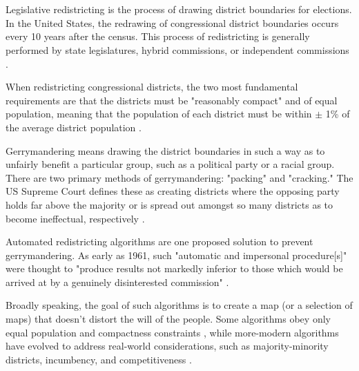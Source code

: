 \makeatletter
\section{\@title}
\makeatother

Legislative redistricting is the process of drawing district boundaries for elections. In the United States, the redrawing of congressional district boundaries occurs every 10 years after the census. This process of redistricting is generally performed by state legislatures, hybrid commissions, or independent commissions \parencite{princetongerrymanderingproject2021}. 

When redistricting congressional districts, the two most fundamental requirements are that the districts must be "reasonably compact" and of equal population, meaning that the population of each district must be within $\pm$ 1\% of the average district population \parencite{1964}. 

Gerrymandering means drawing the district boundaries in such a way as to unfairly benefit a particular group, such as a political party or a racial group. There are two primary methods of gerrymandering: "packing" and "cracking." The US Supreme Court defines these as creating districts where the opposing party holds far above the majority or is spread out amongst so many districts as to become ineffectual, respectively \parencite{1986}.

Automated redistricting algorithms are one proposed solution to prevent gerrymandering. As early as 1961, such "automatic and impersonal procedure[s]" were thought to "produce results not markedly inferior to those which would be arrived at by a genuinely disinterested commission" \parencite[110]{vickrey1961}.

Broadly speaking, the goal of such algorithms is to create a map (or a selection of maps) that doesn't distort the will of the people. Some algorithms obey only equal population and compactness constraints \parencite[e.g.][]{hu1995, altman2011, chen2013}, while more-modern algorithms have evolved to address real-world considerations, such as majority-minority districts, incumbency, and competitiveness \parencite[e.g][]{lara-caballero2019, fifield2020, mccartan2020}. 

